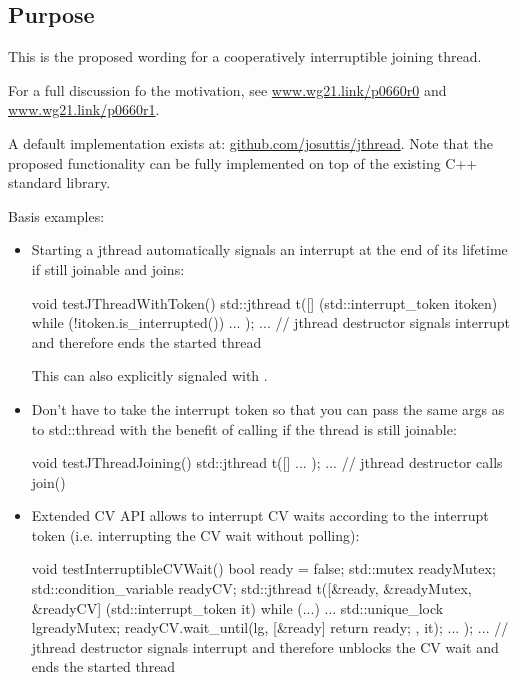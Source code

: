 \subsection*{Purpose}

This is the proposed wording for a cooperatively interruptible joining thread.

For a full discussion fo the motivation, see
\url{www.wg21.link/p0660r0} and
\url{www.wg21.link/p0660r1}.

A default implementation exists at:
\url{github.com/josuttis/jthread}.
Note that the proposed functionality can be fully implemented 
on top of the existing C++ standard library.

Basis examples:
\begin{itemize}
 \item Starting a jthread automatically signals an interrupt at the end of its lifetime if still joinable
        and joins:
\begin{codeblock}
void testJThreadWithToken() 
{
  std::jthread t([] (std::interrupt_token itoken) {
                   while (!itoken.is_interrupted()) {
                     ...
                   }
                 });
  ...
} // jthread destructor signals interrupt and therefore ends the started thread
\end{codeblock}

This can also explicitly signaled with .

 \item Don't have to take the interrupt token so that you can pass the same args as to std::thread
        with the benefit of calling 
        if the thread is still joinable:
\begin{codeblock}
void testJThreadJoining()
{
  std::jthread t([] {
                   ...
                 });
  ...
} // jthread destructor calls join()
\end{codeblock}

 \item Extended CV API allows to interrupt CV waits according to the interrupt token
        (i.e. interrupting the CV wait without polling):
\begin{codeblock}
void testInterruptibleCVWait() 
{
  bool ready = false;
  std::mutex readyMutex;
  std::condition_variable readyCV;
  std::jthread t([&ready, &readyMutex, &readyCV] (std::interrupt_token it) {
                    while (...) {
                      ...
                      {
                        std::unique_lock lg{readyMutex};
                        readyCV.wait_until(lg,
                                           [&ready] {
                                              return ready;
                                           },
                                           it);
                      }
                      ...
                    }
                  });
  ...
} // jthread destructor signals interrupt and therefore unblocks the CV wait and ends the started thread
\end{codeblock}
\end{itemize}

